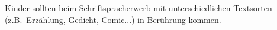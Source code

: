 Kinder sollten beim Schriftspracherwerb mit unterschiedlichen Textsorten (z.B.\ Erzählung, Gedicht, Comic...) in Berührung kommen.